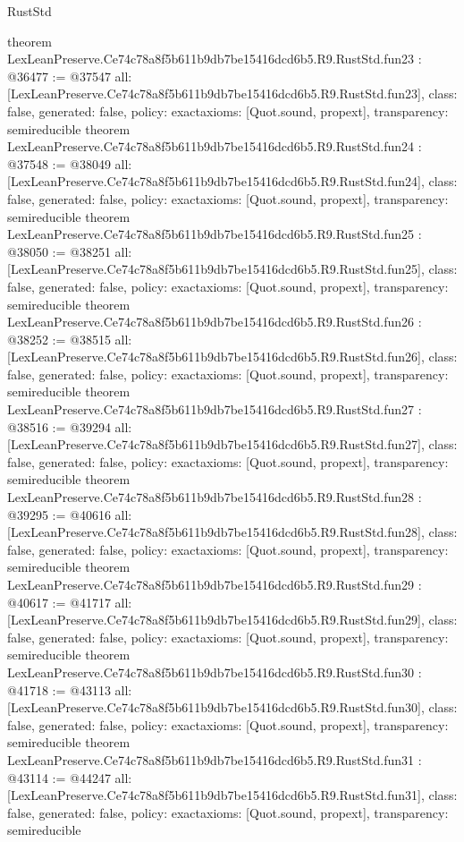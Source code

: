 \begin{lexlean}{RustStd}
\begin{coremodule}
{}
theorem LexLeanPreserve.Ce74c78a8f5b611b9db7be15416dcd6b5.R9.RustStd.fun23 : @36477 := @37547 {
  all: [LexLeanPreserve.Ce74c78a8f5b611b9db7be15416dcd6b5.R9.RustStd.fun23],
  class: false,
  generated: false,
  policy: exact{axioms: [Quot.sound, propext]},
  transparency: semireducible
}
theorem LexLeanPreserve.Ce74c78a8f5b611b9db7be15416dcd6b5.R9.RustStd.fun24 : @37548 := @38049 {
  all: [LexLeanPreserve.Ce74c78a8f5b611b9db7be15416dcd6b5.R9.RustStd.fun24],
  class: false,
  generated: false,
  policy: exact{axioms: [Quot.sound, propext]},
  transparency: semireducible
}
theorem LexLeanPreserve.Ce74c78a8f5b611b9db7be15416dcd6b5.R9.RustStd.fun25 : @38050 := @38251 {
  all: [LexLeanPreserve.Ce74c78a8f5b611b9db7be15416dcd6b5.R9.RustStd.fun25],
  class: false,
  generated: false,
  policy: exact{axioms: [Quot.sound, propext]},
  transparency: semireducible
}
theorem LexLeanPreserve.Ce74c78a8f5b611b9db7be15416dcd6b5.R9.RustStd.fun26 : @38252 := @38515 {
  all: [LexLeanPreserve.Ce74c78a8f5b611b9db7be15416dcd6b5.R9.RustStd.fun26],
  class: false,
  generated: false,
  policy: exact{axioms: [Quot.sound, propext]},
  transparency: semireducible
}
theorem LexLeanPreserve.Ce74c78a8f5b611b9db7be15416dcd6b5.R9.RustStd.fun27 : @38516 := @39294 {
  all: [LexLeanPreserve.Ce74c78a8f5b611b9db7be15416dcd6b5.R9.RustStd.fun27],
  class: false,
  generated: false,
  policy: exact{axioms: [Quot.sound, propext]},
  transparency: semireducible
}
theorem LexLeanPreserve.Ce74c78a8f5b611b9db7be15416dcd6b5.R9.RustStd.fun28 : @39295 := @40616 {
  all: [LexLeanPreserve.Ce74c78a8f5b611b9db7be15416dcd6b5.R9.RustStd.fun28],
  class: false,
  generated: false,
  policy: exact{axioms: [Quot.sound, propext]},
  transparency: semireducible
}
theorem LexLeanPreserve.Ce74c78a8f5b611b9db7be15416dcd6b5.R9.RustStd.fun29 : @40617 := @41717 {
  all: [LexLeanPreserve.Ce74c78a8f5b611b9db7be15416dcd6b5.R9.RustStd.fun29],
  class: false,
  generated: false,
  policy: exact{axioms: [Quot.sound, propext]},
  transparency: semireducible
}
theorem LexLeanPreserve.Ce74c78a8f5b611b9db7be15416dcd6b5.R9.RustStd.fun30 : @41718 := @43113 {
  all: [LexLeanPreserve.Ce74c78a8f5b611b9db7be15416dcd6b5.R9.RustStd.fun30],
  class: false,
  generated: false,
  policy: exact{axioms: [Quot.sound, propext]},
  transparency: semireducible
}
theorem LexLeanPreserve.Ce74c78a8f5b611b9db7be15416dcd6b5.R9.RustStd.fun31 : @43114 := @44247 {
  all: [LexLeanPreserve.Ce74c78a8f5b611b9db7be15416dcd6b5.R9.RustStd.fun31],
  class: false,
  generated: false,
  policy: exact{axioms: [Quot.sound, propext]},
  transparency: semireducible
}
\end{coremodule}
\end{lexlean}
